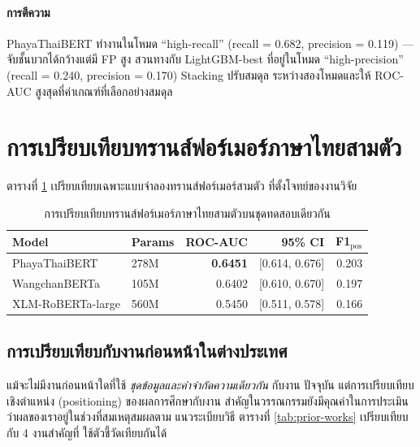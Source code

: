 \paragraph{การตีความ}
PhayaThaiBERT ทำงานในโหมด ``high-recall'' (recall = 0.682, precision = 0.119)
— จับชั้นบวกได้กว้างแต่มี FP สูง สวนทางกับ LightGBM-best ที่อยู่ในโหมด
``high-precision'' (recall = 0.240, precision = 0.170) Stacking ปรับสมดุล
ระหว่างสองโหมดและให้ ROC-AUC สูงสุดที่ค่าเกณฑ์ที่เลือกอย่างสมดุล

\section{การเปรียบเทียบทรานส์ฟอร์เมอร์ภาษาไทยสามตัว}
\label{sec:results-encoders}

ตารางที่ \ref{tab:encoders} เปรียบเทียบเฉพาะแบบจำลองทรานส์ฟอร์เมอร์สามตัว
ที่ตั้งโจทย์ของงานวิจัย

\begin{table}[H]
\centering
\caption{การเปรียบเทียบทรานส์ฟอร์เมอร์ภาษาไทยสามตัวบนชุดทดสอบเดียวกัน}
\label{tab:encoders}
\begin{tabularx}{\textwidth}{lXrrr}
\toprule
\textbf{Model} & \textbf{Params} & \textbf{ROC-AUC} & \textbf{95\% CI} & \textbf{F1$_{\text{pos}}$} \\
\midrule
PhayaThaiBERT       & 278M & \textbf{0.6451} & [0.614, 0.676] & 0.203 \\
WangchanBERTa       & 105M & 0.6402          & [0.610, 0.670] & 0.197 \\
XLM-RoBERTa-large   & 560M & 0.5450          & [0.511, 0.578] & 0.166 \\
\bottomrule
\end{tabularx}
\end{table}

\subsection{การเปรียบเทียบกับงานก่อนหน้าในต่างประเทศ}
\label{sec:results-prior}

แม้จะไม่มีงานก่อนหน้าใดที่ใช้ \emph{ชุดข้อมูลและคำจำกัดความเดียวกัน} กับงาน
ปัจจุบัน แต่การเปรียบเทียบเชิงตำแหน่ง (positioning) ของผลการศึกษากับงาน
สำคัญในวรรณกรรมยังมีคุณค่าในการประเมินว่าผลของเราอยู่ในช่วงที่สมเหตุสมผลตาม
แนวระเบียบวิธี ตารางที่ \ref{tab:prior-works} เปรียบเทียบกับ 4 งานสำคัญที่
ใช้ตัวชี้วัดเทียบกันได้

